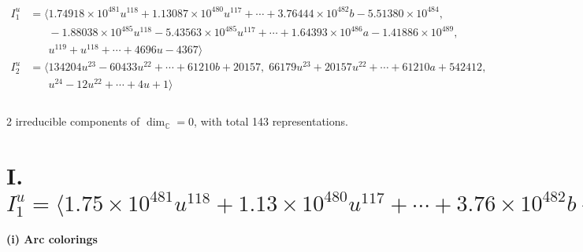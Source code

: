 \documentclass[1p]{elsarticle_modified}
\theoremstyle{definition}
\begin{document}
\begin{align*}
I^u_{1}&=\langle 
1.74918\times10^{481} u^{118}+1.13087\times10^{480} u^{117}+\cdots+3.76444\times10^{482} b-5.51380\times10^{484},\\
\phantom{I^u_{1}}&\phantom{= \langle  }-1.88038\times10^{485} u^{118}-5.43563\times10^{485} u^{117}+\cdots+1.64393\times10^{486} a-1.41886\times10^{489},\\
\phantom{I^u_{1}}&\phantom{= \langle  }u^{119}+u^{118}+\cdots+4696 u-4367\rangle \\
I^u_{2}&=\langle 
134204 u^{23}-60433 u^{22}+\cdots+61210 b+20157,\;66179 u^{23}+20157 u^{22}+\cdots+61210 a+542412,\\
\phantom{I^u_{2}}&\phantom{= \langle  }u^{24}-12 u^{22}+\cdots+4 u+1\rangle \\
\\
\end{align*}
\raggedright * 2 irreducible components of $\dim_{\mathbb{C}}=0$, with total 143 representations.\\
\newpage
\renewcommand{\arraystretch}{1}
\centering \section*{I. $I^u_{1}= \langle 1.75\times10^{481} u^{118}+1.13\times10^{480} u^{117}+\cdots+3.76\times10^{482} b-5.51\times10^{484},\;-1.88\times10^{485} u^{118}-5.44\times10^{485} u^{117}+\cdots+1.64\times10^{486} a-1.42\times10^{489},\;u^{119}+u^{118}+\cdots+4696 u-4367 \rangle$}
\flushleft \textbf{(i) Arc colorings}\\
\end{document}
